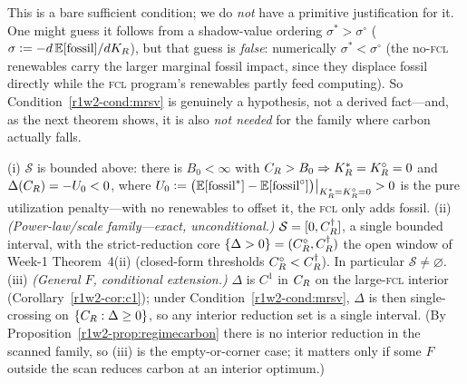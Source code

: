 This is a bare sufficient condition; we do \emph{not} have a primitive
justification for it. One might guess it follows from a shadow-value ordering
$\sigma^{*}>\sigma^{\circ}$ ($\sigma\vcentcolon=-d\,\mathbb{E}[\text{fossil}]/dK_R$), but that
guess is \emph{false}: numerically $\sigma^{*}<\sigma^{\circ}$ (the no-\textsc{fcl}
renewables carry the larger marginal fossil impact, since they displace fossil
directly while the \textsc{fcl} program's renewables partly feed computing). So
Condition~\ref{r1w2-cond:mrsv} is genuinely a hypothesis, not a derived fact---and, as the
next theorem shows, it is also \emph{not needed} for the family where carbon
actually falls.

\begin{theorem}\label{r1w2-thm:connected}
\textup{(i)} $\mathcal S$ is bounded above: there is $B_0<\infty$ with
$C_R>B_0\Rightarrow K_R^{*}=K_R^{\circ}=0$ and $\Delta(C_R)=-U_0<0$, where
$U_0\vcentcolon=\big(\mathbb{E}[\text{fossil}^{*}]-\mathbb{E}[\text{fossil}^{\circ}]\big)\big|_{K_R^{*}=K_R^{\circ}=0}>0$
is the pure utilization penalty---with no renewables to offset it, the \textsc{fcl}
only adds fossil. \textup{(ii)} \emph{(Power-law/scale family---exact,
unconditional.)} $\mathcal S=[0,C_R^{\dagger}]$, a single bounded interval, with the
strict-reduction core $\{\Delta>0\}=(C_R^{\circ},C_R^{\dagger})$ the open window of
Week-1 Theorem~4(ii) (closed-form thresholds $C_R^{\circ}<C_R^{\dagger}$). In
particular $\mathcal S\neq\varnothing$. \textup{(iii)} \emph{(General $F$,
conditional extension.)} $\Delta$ is $C^{1}$ in $C_R$ on the large-\textsc{fcl}
interior (Corollary~\ref{r1w2-cor:c1}); under Condition~\ref{r1w2-cond:mrsv}, $\Delta$ is then
single-crossing on $\{C_R:\Delta\ge0\}$, so any interior reduction set is a single
interval. (By Proposition~\ref{r1w2-prop:regimecarbon} there is no interior reduction in
the scanned family, so (iii) is the empty-or-corner case; it matters only if some
$F$ outside the scan reduces carbon at an interior optimum.)
\end{theorem}

